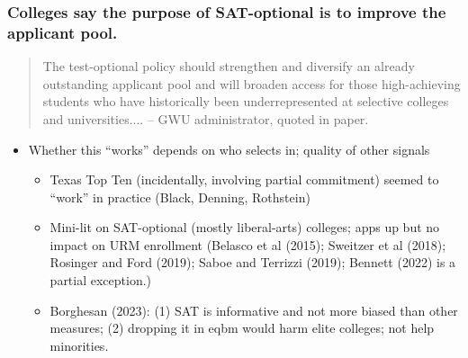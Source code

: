 \documentclass[11pt, aspectratio=169]{beamer}
\theoremstyle{plain}
\theoremstyle{plain}
\theoremstyle{plain}
\theoremstyle{plain}
\begin{document}
\begin{frame}\frametitle{Colleges say the purpose of SAT-optional is to improve the applicant pool.}
    \begin{quotation} The test-optional policy should strengthen and diversify an already outstanding applicant pool and will broaden access for those high-achieving students who have historically been underrepresented at selective colleges and universities....
        -- GWU administrator, quoted in paper. \end{quotation} \pause
    \begin{itemize}
        \item Whether this ``works'' depends on who selects in; quality of other signals \pause
        \begin{itemize}   %
            \item Texas Top Ten (incidentally, involving partial commitment) seemed to ``work'' in practice (Black, Denning, Rothstein) \pause
            \item Mini-lit on SAT-optional (mostly liberal-arts) colleges; apps up but no impact on URM enrollment (Belasco et al (2015); Sweitzer et al (2018); Rosinger and Ford (2019); Saboe and Terrizzi (2019); Bennett (2022) is a partial exception.) \pause
            \item Borghesan (2023): (1) SAT is informative and not more biased than other measures; (2) dropping it in eqbm would harm elite colleges; not help minorities.
        \end{itemize}
    \end{itemize}
\end{frame}
\end{document}
